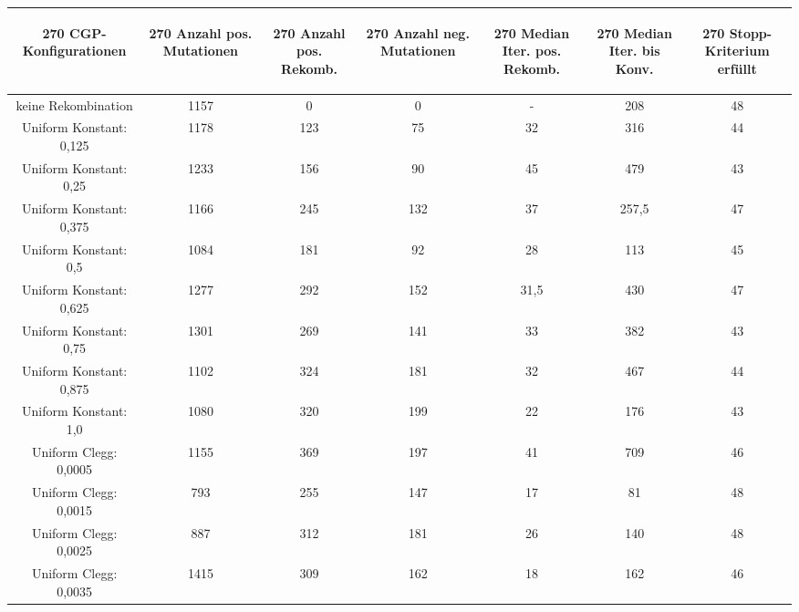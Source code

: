 \begin{table}[H]
	\centering
	\begin{tabular}{c | c | c | c | c | c | c}
		\begin{turn}{270} \textbf{CGP-Konfigurationen} \end{turn} & \begin{turn}{270} \textbf{Anzahl pos. Mutationen} \end{turn} & \begin{turn}{270} \textbf{Anzahl pos. Rekomb.} \end{turn} & \begin{turn}{270} \textbf{Anzahl neg. Mutationen} \end{turn} & \begin{turn}{270} \textbf{Median Iter. pos. Rekomb.} \end{turn} & \begin{turn}{270} \textbf{Median Iter. bis Konv.} \end{turn} & \begin{turn}{270} \textbf{Stopp-Kriterium erfüllt} \end{turn}\\
		\hline
		keine Rekombination & 1157 & 0 & 0 & - & 208 & 48\\
		\hline
		Uniform Konstant: 0,125 & 1178 & 123 & 75 & 32 & 316 & 44\\
		\hline
		Uniform Konstant: 0,25 & 1233 & 156 & 90 & 45 & 479 & 43\\
		\hline
		Uniform Konstant: 0,375 & 1166 & 245 & 132 & 37 & 257,5 & 47\\
		\hline
		Uniform Konstant: 0,5 & 1084 & 181 & 92 & 28 & 113 & 45\\
		\hline
		Uniform Konstant: 0,625 & 1277 & 292 & 152 & 31,5 & 430 & 47\\
		\hline
		Uniform Konstant: 0,75 & 1301 & 269 & 141 & 33 & 382 & 43\\
		\hline
		Uniform Konstant: 0,875 & 1102 & 324 & 181 & 32 & 467 & 44\\
		\hline
		Uniform Konstant: 1,0 & 1080 & 320 & 199 & 22 & 176 & 43\\
		\hline
		Uniform Clegg: 0,0005 & 1155 & 369 & 197 & 41 & 709 & 46\\
		\hline
		Uniform Clegg: 0,0015 & 793 & 255 & 147 & 17 & 81 & 48\\
		\hline
		Uniform Clegg: 0,0025 & 887 & 312 & 181 & 26 & 140 & 48\\
		\hline
		Uniform Clegg: 0,0035 & 1415 & 309 & 162 & 18 & 162 & 46\\

\end{tabular}
\end{table}
